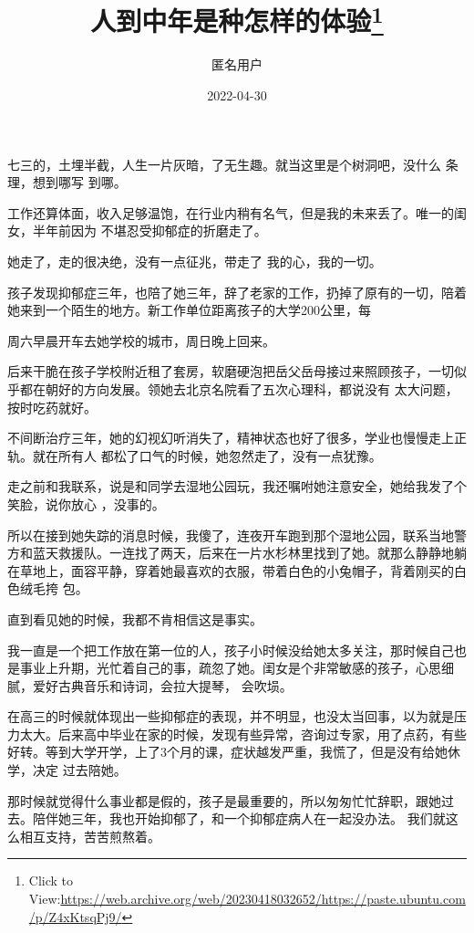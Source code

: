 \documentclass{article}
\title{人到中年是种怎样的体验\footnote{Click to View:\url{https://web.archive.org/web/20230418032652/https://paste.ubuntu.com/p/Z4xKtsqPj9/}}}
\author{匿名用户}
\date{2022-04-30}
\begin{document}

\maketitle


\Large

﻿七三的，土埋半截，人生一片灰暗，了无生趣。就当这里是个树洞吧，没什么 条理，想到哪写
到哪。 

工作还算体面，收入足够温饱，在行业内稍有名气，但是我的未来丢了。唯一的闺女，半年前因为
不堪忍受抑郁症的折磨走了。 

她走了，走的很决绝，没有一点征兆，带走了
我的心，我的一切。 

孩子发现抑郁症三年，也陪了她三年，辞了老家的工作，扔掉了原有的一切，陪着她来到一个陌生的地方。新工作单位距离孩子的大学200公里，每

\newpage
周六早晨开车去她学校的城市，周日晚上回来。 

后来干脆在孩子学校附近租了套房，软磨硬泡把岳父岳母接过来照顾孩子，一切似乎都在朝好的方向发展。领她去北京名院看了五次心理科，都说没有
太大问题，按时吃药就好。 

不间断治疗三年，她的幻视幻听消失了，精神状态也好了很多，学业也慢慢走上正轨。就在所有人
都松了口气的时候，她忽然走了，没有一点犹豫。 

走之前和我联系，说是和同学去湿地公园玩，我还嘱咐她注意安全，她给我发了个笑脸，说你放心
，没事的。 

所以在接到她失踪的消息时候，我傻了，连夜开车跑到那个湿地公园，联系当地警方和蓝天救援队。一连找了两天，后来在一片水杉林里找到了她。就那么静静地躺在草地上，面容平静，穿着她最喜欢的衣服，带着白色的小兔帽子，背着刚买的白色绒毛挎
包。 

\newpage

直到看见她的时候，我都不肯相信这是事实。
 

我一直是一个把工作放在第一位的人，孩子小时候没给她太多关注，那时候自己也是事业上升期，光忙着自己的事，疏忽了她。闺女是个非常敏感的孩子，心思细腻，爱好古典音乐和诗词，会拉大提琴，
会吹埙。 

在高三的时候就体现出一些抑郁症的表现，并不明显，也没太当回事，以为就是压力太大。后来高中毕业在家的时候，发现有些异常，咨询过专家，用了点药，有些好转。等到大学开学，上了3个月的课，症状越发严重，我慌了，但是没有给她休学，决定
过去陪她。 

那时候就觉得什么事业都是假的，孩子是最重要的，所以匆匆忙忙辞职，跟她过去。陪伴她三年，我也开始抑郁了，和一个抑郁症病人在一起没办法。
我们就这么相互支持，苦苦煎熬着。 
\end{document}
